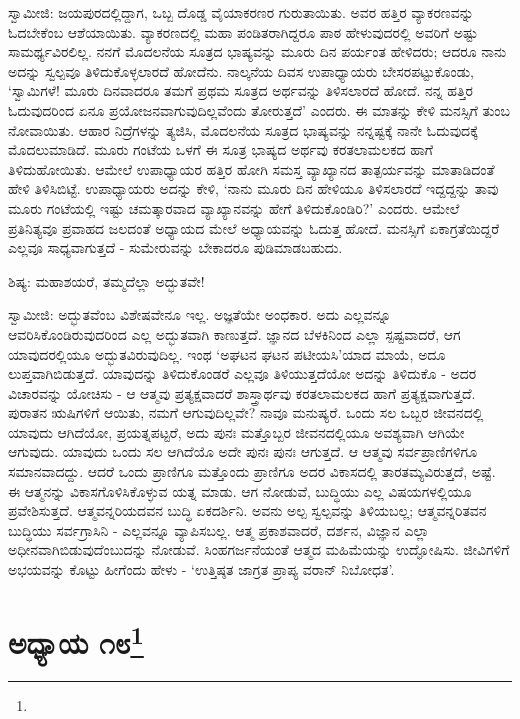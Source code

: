 ಸ್ವಾಮೀಜಿ: ಜಯಪುರದಲ್ಲಿದ್ದಾಗ, ಒಬ್ಬ ದೊಡ್ಡ ವೈಯಾಕರಣರ ಗುರುತಾಯಿತು. ಅವರ ಹತ್ತಿರ ವ್ಯಾಕರಣವನ್ನು ಓದಬೇಕೆಂಬ ಆಶೆಯಾಯಿತು. ವ್ಯಾಕರಣದಲ್ಲಿ ಮಹಾ ಪಂಡಿತರಾಗಿದ್ದರೂ ಪಾಠ ಹೇಳುವುದರಲ್ಲಿ ಅವರಿಗೆ ಅಷ್ಟು ಸಾಮರ್ಥ್ಯವಿರಲಿಲ್ಲ. ನನಗೆ ಮೊದಲನೆಯ ಸೂತ್ರದ ಭಾಷ್ಯವನ್ನು ಮೂರು ದಿನ ಪರ್ಯಂತ ಹೇಳಿದರು; ಆದರೂ ನಾನು ಅದನ್ನು ಸ್ವಲ್ಪವೂ ತಿಳಿದುಕೊಳ್ಳಲಾರದೆ ಹೋದೆನು. ನಾಲ್ಕನೆಯ ದಿವಸ ಉಪಾಧ್ಯಾಯರು ಬೇಸರಪಟ್ಟುಕೊಂಡು, ‘ಸ್ವಾಮಿಗಳೆ! ಮೂರು ದಿನವಾದರೂ ತಮಗೆ ಪ್ರಥಮ ಸೂತ್ರದ ಅರ್ಥವನ್ನು ತಿಳಿಸಲಾರದೆ ಹೋದೆ. ನನ್ನ ಹತ್ತಿರ ಓದುವುದರಿಂದ ಏನೂ ಪ್ರಯೋಜನವಾಗುವುದಿಲ್ಲವೆಂದು ತೋರುತ್ತದೆ’ ಎಂದರು. ಈ ಮಾತನ್ನು ಕೇಳಿ ಮನಸ್ಸಿಗೆ ತುಂಬ ನೋವಾಯಿತು. ಆಹಾರ ನಿದ್ರೆಗಳನ್ನು ತ್ಯಜಿಸಿ, ಮೊದಲನೆಯ ಸೂತ್ರದ ಭಾಷ್ಯವನ್ನು ನನ್ನಷ್ಟಕ್ಕೆ ನಾನೇ ಓದುವುದಕ್ಕೆ ಮೊದಲುಮಾಡಿದೆ. ಮೂರು ಗಂಟೆಯ ಒಳಗೆ ಈ ಸೂತ್ರ ಭಾಷ್ಯದ ಅರ್ಥವು ಕರತಲಾಮಲಕದ ಹಾಗೆ ತಿಳಿದುಹೋಯಿತು. ಆಮೇಲೆ ಉಪಾಧ್ಯಾಯರ ಹತ್ತಿರ ಹೋಗಿ ಸಮಸ್ತ ವ್ಯಾಖ್ಯಾನದ ತಾತ್ಪರ್ಯವನ್ನು ಮಾತಾಡಿದಂತೆ ಹೇಳಿ ತಿಳಿಸಿಬಿಟ್ಟೆ. ಉಪಾಧ್ಯಾಯರು ಅದನ್ನು ಕೇಳಿ, ‘ನಾನು ಮೂರು ದಿನ ಹೇಳಿಯೂ ತಿಳಿಸಲಾರದೆ ಇದ್ದದ್ದನ್ನು ತಾವು ಮೂರು ಗಂಟೆಯಲ್ಲಿ ಇಷ್ಟು ಚಮತ್ಕಾರವಾದ ವ್ಯಾಖ್ಯಾನವನ್ನು ಹೇಗೆ ತಿಳಿದುಕೊಂಡಿರಿ?’ ಎಂದರು. ಆಮೇಲೆ ಪ್ರತಿನಿತ್ಯವೂ ಪ್ರವಾಹದ ಜಲದಂತೆ ಅಧ್ಯಾಯದ ಮೇಲೆ ಅಧ್ಯಾಯವನ್ನು ಓದುತ್ತ ಹೋದೆ. ಮನಸ್ಸಿಗೆ ಏಕಾಗ್ರತೆಯಿದ್ದರೆ ಎಲ್ಲವೂ ಸಾಧ್ಯವಾಗುತ್ತದೆ - ಸುಮೇರುವನ್ನು ಬೇಕಾದರೂ ಪುಡಿಮಾಡಬಹುದು.

ಶಿಷ್ಯ: ಮಹಾಶಯರೆ, ತಮ್ಮದೆಲ್ಲಾ ಅದ್ಭುತವೇ!

ಸ್ವಾಮೀಜಿ: ಅದ್ಭುತವೆಂಬ ವಿಶೇಷವೇನೂ ಇಲ್ಲ. ಅಜ್ಞತೆಯೇ ಅಂಧಕಾರ. ಅದು ಎಲ್ಲವನ್ನೂ ಆವರಿಸಿಕೊಂಡಿರುವುದರಿಂದ ಎಲ್ಲ ಅದ್ಭುತವಾಗಿ ಕಾಣುತ್ತದೆ. ಜ್ಞಾನದ ಬೆಳಕಿನಿಂದ ಎಲ್ಲಾ ಸ್ಪಷ್ಟವಾದರೆ, ಆಗ ಯಾವುದರಲ್ಲಿಯೂ ಅದ್ಭುತವಿರುವುದಿಲ್ಲ. ಇಂಥ ‘ಅಘಟನ ಘಟನ ಪಟೀಯಸಿ’ಯಾದ ಮಾಯೆ, ಅದೂ ಲುಪ್ತವಾಗಿಬಿಡುತ್ತದೆ. ಯಾವುದನ್ನು ತಿಳಿದುಕೊಂಡರೆ ಎಲ್ಲವೂ ತಿಳಿಯುತ್ತದೆಯೋ ಅದನ್ನು ತಿಳಿದುಕೊ - ಅದರ ವಿಚಾರವನ್ನು ಯೋಚಿಸು - ಆ ಆತ್ಮವು ಪ್ರತ್ಯಕ್ಷವಾದರೆ ಶಾಸ್ತ್ರಾರ್ಥವು ಕರತಲಾಮಲಕದ ಹಾಗೆ ಪ್ರತ್ಯಕ್ಷವಾಗುತ್ತದೆ. ಪುರಾತನ ಋಷಿಗಳಿಗೆ ಆಯಿತು, ನಮಗೆ ಆಗುವುದಿಲ್ಲವೇ? ನಾವೂ ಮನುಷ್ಯರೆ. ಒಂದು ಸಲ ಒಬ್ಬರ ಜೀವನದಲ್ಲಿ ಯಾವುದು ಆಗಿದೆಯೋ, ಪ್ರಯತ್ನಪಟ್ಟರೆ, ಅದು ಪುನಃ ಮತ್ತೊಬ್ಬರ ಜೀವನದಲ್ಲಿಯೂ ಅವಶ್ಯವಾಗಿ ಆಗಿಯೇ ಆಗುವುದು. ಯಾವುದು ಒಂದು ಸಲ ಆಗಿದೆಯೊ ಅದೇ ಪುನಃ ಪುನಃ ಆಗುತ್ತದೆ. ಆ ಆತ್ಮವು ಸರ್ವಪ್ರಾಣಿಗಳಿಗೂ ಸಮಾನವಾದದ್ದು. ಆದರೆ ಒಂದು ಪ್ರಾಣಿಗೂ ಮತ್ತೊಂದು ಪ್ರಾಣಿಗೂ ಅದರ ವಿಕಾಸದಲ್ಲಿ ತಾರತಮ್ಯವಿರುತ್ತದೆ, ಅಷ್ಟೆ. ಈ ಆತ್ಮನನ್ನು ವಿಕಾಸಗೊಳಿಸಿಕೊಳ್ಳುವ ಯತ್ನ ಮಾಡು. ಆಗ ನೋಡುವೆ, ಬುದ್ಧಿಯು ಎಲ್ಲ ವಿಷಯಗಳಲ್ಲಿಯೂ ಪ್ರವೇಶಿಸುತ್ತದೆ. ಆತ್ಮವನ್ನರಿಯದವನ ಬುದ್ಧಿ ಏಕದರ್ಶಿನಿ. ಅವನು ಅಲ್ಪ ಸ್ವಲ್ಪವನ್ನು ತಿಳಿಯಬಲ್ಲ; ಆತ್ಮವನ್ನರಿತವನ ಬುದ್ಧಿಯು ಸರ್ವಗ್ರಾಸಿನಿ - ಎಲ್ಲವನ್ನೂ ವ್ಯಾಪಿಸಬಲ್ಲ. ಆತ್ಮ ಪ್ರಕಾಶವಾದರೆ, ದರ್ಶನ, ವಿಜ್ಞಾನ ಎಲ್ಲಾ ಅಧೀನವಾಗಿಬಿಡುವುದೆಂಬುದನ್ನು ನೋಡುವೆ. ಸಿಂಹಗರ್ಜನೆಯಂತೆ ಆತ್ಮದ ಮಹಿಮೆಯನ್ನು ಉದ್ಘೋಷಿಸು. ಜೀವಿಗಳಿಗೆ ಅಭಯವನ್ನು ಕೊಟ್ಟು ಹೀಗೆಂದು ಹೇಳು - ‘ಉತ್ತಿಷ್ಠತ ಜಾಗ್ರತ ಪ್ರಾಪ್ಯ ವರಾನ್ ನಿಬೋಧತ’.

\newpage

\chapter[ಅಧ್ಯಾಯ ೧೮]{ಅಧ್ಯಾಯ ೧೮\protect\footnote{}}

